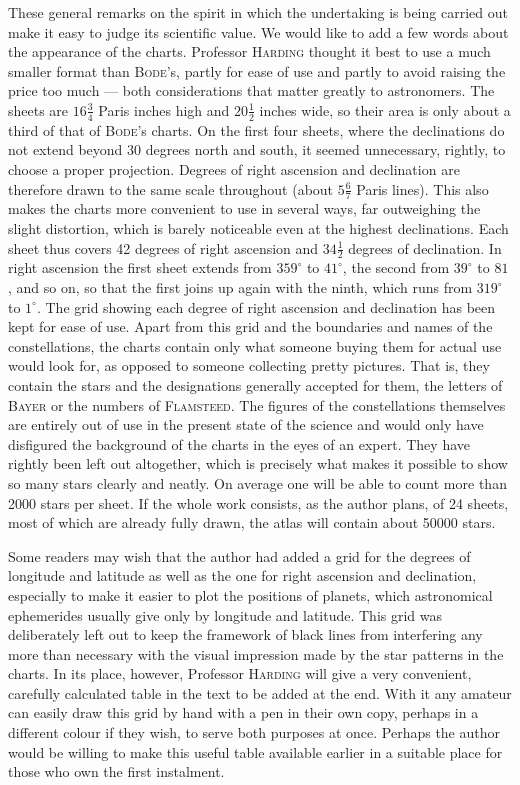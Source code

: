 These general remarks on the spirit in which the undertaking is being carried out make it easy to judge its scientific value. We would like to add a few words about the appearance of the charts. Professor \textsc{Harding} thought it best to use a much smaller format than \textsc{Bode}’s, partly for ease of use and partly to avoid raising the price too much --- both considerations that matter greatly to astronomers. The sheets are $16\frac{3}{4}$ Paris inches high and $20\frac{1}{2}$ inches wide, so their area is only about a third of that of \textsc{Bode}’s charts. On the first four sheets, where the declinations do not extend beyond 30 degrees north and south, it seemed unnecessary, rightly, to choose a proper projection. Degrees of right ascension and declination are therefore drawn to the same scale throughout (about $5\frac{6}{7}$ Paris lines). This also makes the charts more convenient to use in several ways, far outweighing the slight distortion, which is barely noticeable even at the highest declinations. Each sheet thus covers 42 degrees of right ascension and $34\frac{1}{2}$ degrees of declination. In right ascension the first sheet extends from $359^\circ$ to $41^\circ$, the second from $39^\circ$ to $81$, and so on, so that the first joins up again with the ninth, which runs from $319^\circ$ to $1^\circ$. The grid showing each degree of right ascension and declination has been kept for ease of use. Apart from this grid and the boundaries and names of the constellations, the charts contain only what someone buying them for actual use would look for, as opposed to someone collecting pretty pictures. That is, they contain the stars and the designations generally accepted for them, the letters of \textsc{Bayer} or the numbers of \textsc{Flamsteed}. The figures of the constellations themselves are entirely out of use in the present state of the science and would only have disfigured the background of the charts in the eyes of an expert. They have rightly been left out altogether, which is precisely what makes it possible to show so many stars clearly and neatly. On average one will be able to count more than 2000 stars per sheet. If the whole work consists, as the author plans, of 24 sheets, most of which are already fully drawn, the atlas will contain about 50000 stars.

Some readers may wish that the author had added a grid for the degrees of longitude and latitude as well as the one for right ascension and declination, especially to make it easier to plot the positions of planets, which astronomical ephemerides usually give only by longitude and latitude. This grid was deliberately left out to keep the framework of black lines from interfering any more than necessary with the visual impression made by the star patterns in the charts. In its place, however, Professor \textsc{Harding} will give a very convenient, carefully calculated table in the text to be added at the end. With it any amateur can easily draw this grid by hand with a pen in their own copy, perhaps in a different colour if they wish, to serve both purposes at once. Perhaps the author would be willing to make this useful table available earlier in a suitable place for those who own the first instalment.


